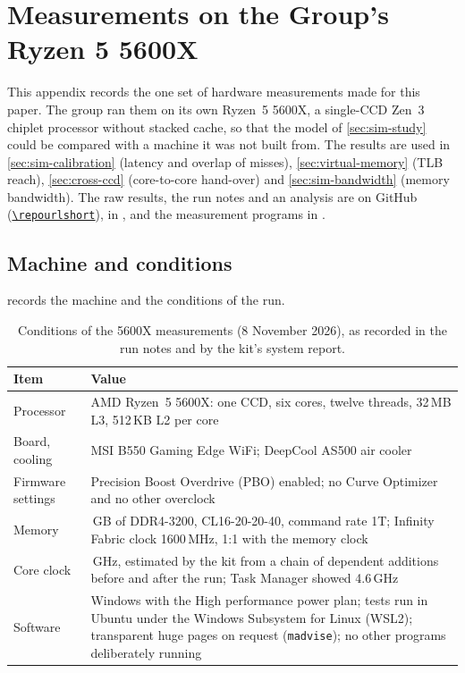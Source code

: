 \clearpage
\section{Measurements on the Group's Ryzen 5 5600X}
\label{app:5600x}

This appendix records the one set of hardware measurements made for this paper. The group ran them on its own Ryzen~5 5600X, a single-CCD Zen~3 chiplet processor without stacked cache, so that the model of \cref{sec:sim-study} could be compared with a machine it was not built from. The results are used in \cref{sec:sim-calibration} (latency and overlap of misses), \cref{sec:virtual-memory} (TLB reach), \cref{sec:cross-ccd} (core-to-core hand-over) and \cref{sec:sim-bandwidth} (memory bandwidth). The raw results, the run notes and an analysis are on GitHub (\href{\repourl}{\nolinkurl{\repourlshort}}), in , and the measurement programs in .

\subsection*{Machine and conditions}
 records the machine and the conditions of the run.

\begin{table}[htbp]
  \centering
  \caption[Conditions of the 5600X measurements]{Conditions of the 5600X measurements (8 November 2026), as recorded in the run notes and by the kit's system report.}
  \label{tab:m5600x-conditions}
  \small
  \begin{tabularx}{\textwidth}{@{}>{\raggedright\arraybackslash}p{4.2cm}>{\raggedright\arraybackslash}X@{}}
    \toprule
    \textbf{Item} & \textbf{Value} \\
    \midrule
    Processor & AMD Ryzen~5 5600X: one CCD, six cores, twelve threads, 32\,MB L3, 512\,KB L2 per core \\
    Board, cooling & MSI B550 Gaming Edge WiFi; DeepCool AS500 air cooler \\
    Firmware settings & Precision Boost Overdrive (PBO) enabled; no Curve Optimizer and no other overclock \\
    Memory & 32\,GB of DDR4-3200, CL16-20-20-40, command rate 1T; Infinity Fabric clock 1600\,MHz, 1:1 with the memory clock \\
    Core clock & 4.614\,GHz, estimated by the kit from a chain of dependent additions before and after the run; Task Manager showed 4.6\,GHz \\
    Software & Windows with the High performance power plan; tests run in Ubuntu under the Windows Subsystem for Linux (WSL2); transparent huge pages on request (\texttt{madvise}); no other programs deliberately running \\
    \bottomrule
  \end{tabularx}
\end{table}

